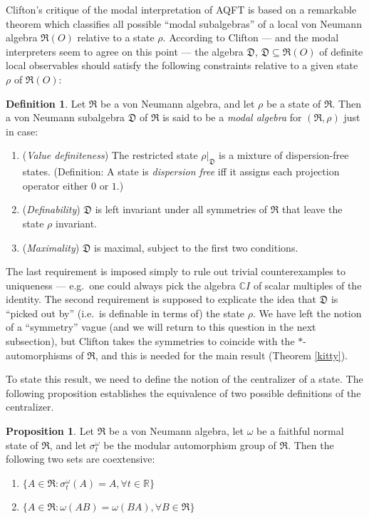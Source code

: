 \documentclass[12pt]{article}
\newcommand{\alg}[1]{\mathfrak{#1}}
\theoremstyle{definition}
\newtheorem{prop}[thm]{Proposition}
\theoremstyle{definition}
\newtheorem{defn}[thm]{Definition}
\theoremstyle{remark}
\def\7#1{{\mathbb #1}}
\def\om{\omega} \def\Om{\Omega} \def\dd{\partial} \def\D{\Delta}
\begin{document}
Clifton's critique of the modal interpretation of AQFT is based on a
remarkable theorem which classifies all possible ``modal subalgebras''
of a local von Neumann algebra $\alg{R}(O)$ relative to a state
$\rho$.  According to Clifton --- and the modal interpreters seem to
agree on this point --- the algebra $\alg{D}$, $\alg{D}\subseteq
\alg{R}(O)$ of definite local observables should satisfy the following
constraints relative to a given state $\rho$ of $\alg{R}(O)$:

\begin{defn} Let $\alg{R}$ be a von Neumann algebra, and let $\rho$ be
  a state of $\alg{R}$.  Then a von Neumann subalgebra $\alg{D}$ of
  $\alg{R}$ is said to be a \emph{modal algebra} for $(\alg{R},\rho )$
  just in case:
  \begin{enumerate}
  \item (\emph{Value definiteness}) The restricted state $\rho
    |_{\alg{D}}$ is a mixture of dispersion-free states.  (Definition:
    A state is \emph{dispersion free} iff it assigns each projection
    operator either $0$ or $1$.)
  \item (\emph{Definability}) $\alg{D}$ is left invariant under all
    symmetries of $\alg{R}$ that leave the state $\rho$ invariant.
  \item (\emph{Maximality}) $\alg{D}$ is maximal, subject to the first
    two conditions.
  \end{enumerate} \label{modal-alg}
\end{defn}

The last requirement is imposed simply to rule out trivial
counterexamples to uniqueness --- e.g.\ one could always pick the
algebra $\7C I$ of scalar multiples of the identity.  The second
requirement is supposed to explicate the idea that $\alg{D}$ is
``picked out by'' (i.e.\ is definable in terms of) the state $\rho$.
We have left the notion of a ``symmetry'' vague (and we will return to
this question in the next subsection), but Clifton takes the
symmetries to coincide with the $*$-automorphisms of $\alg{R}$, and
this is needed for the main result (Theorem \ref{kitty}).

To state this result, we need to define the notion of the centralizer
of a state.  The following proposition establishes the equivalence of
two possible definitions of the centralizer.

\begin{prop} Let $\alg{R}$ be a von Neumann algebra, let $\om$ be a
  faithful normal state of $\alg{R}$, and let $\sigma _t^\om$ be the
  modular automorphism group of $\alg{R}$.  Then the following two
  sets are coextensive:
  \begin{enumerate}
  \item $\{ A\in \alg{R}:\sigma _t^{\om}(A)=A, \forall t\in \7R \}$
  \item $\{ A\in \alg{R}:\om (AB)=\om (BA), \forall B\in \alg{R} \}$
  \end{enumerate} \label{cent}
\end{prop}
\end{document}
